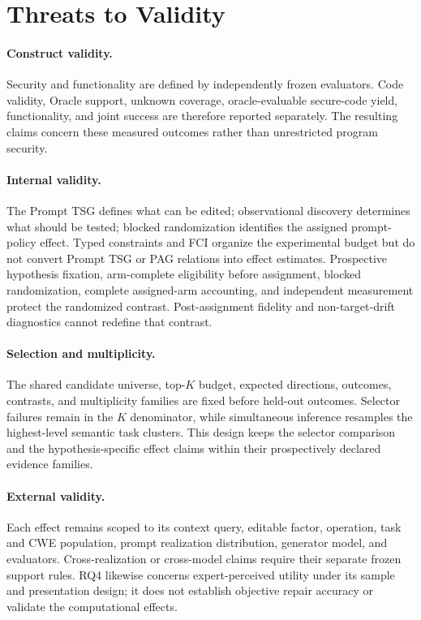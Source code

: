 \section{Threats to Validity}

\paragraph{Construct validity.}
Security and functionality are defined by independently frozen evaluators.
Code validity, Oracle support, unknown coverage, oracle-evaluable secure-code
yield, functionality, and joint success are therefore reported separately.
The resulting claims concern these measured outcomes rather than unrestricted
program security.

\paragraph{Internal validity.}
The Prompt TSG defines what can be edited; observational discovery determines
what should be tested; blocked randomization identifies the assigned
prompt-policy effect. Typed constraints and FCI organize the experimental
budget but do not convert Prompt TSG or PAG relations into effect estimates.
Prospective hypothesis fixation, arm-complete eligibility before assignment,
blocked randomization, complete assigned-arm accounting, and independent
measurement protect the randomized contrast. Post-assignment fidelity and
non-target-drift diagnostics cannot redefine that contrast.

\paragraph{Selection and multiplicity.}
The shared candidate universe, top-$K$ budget, expected directions, outcomes,
contrasts, and multiplicity families are fixed before held-out outcomes.
Selector failures remain in the $K$ denominator, while simultaneous inference
resamples the highest-level semantic task clusters. This design keeps the
selector comparison and the hypothesis-specific effect claims within their
prospectively declared evidence families.

\paragraph{External validity.}
Each effect remains scoped to its context query, editable factor, operation,
task and CWE population, prompt realization distribution, generator model,
and evaluators. Cross-realization or cross-model claims require their separate
frozen support rules. RQ4 likewise concerns expert-perceived utility under its
sample and presentation design; it does not establish objective repair
accuracy or validate the computational effects.
